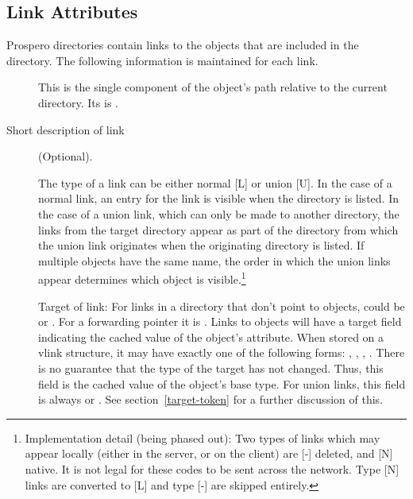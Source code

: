 \subsection{Link Attributes\label{target-attribute}}

Prospero directories contain links to the objects that are included in
the directory. The following information is maintained for each link.

\begin{description}

\item[] This is the single component of the
object's path relative to the current directory.  Its
 is .

\item[Short description of link] (Optional).

\item[]  The type of a link can be either 
normal [L] or union [U].  In the case of a normal link, an entry for
the link is visible when the directory is listed.  In the case of a
union link, which can only be made to another directory, the links
from the target directory appear as part of the directory from which
the union link originates when the originating directory is listed.
If multiple objects have the same name, the order in which the union
links appear determines which object is
visible.\footnote{Implementation detail (being phased out):
Two types of links which may appear locally (either in the server, or
on the client) are [-] deleted, and [N] native.  It is not legal for
these codes to be sent across the network.  Type [N] links are
converted to [L] and type [-] are skipped entirely.}

\item[]  Target of link:  For links in a directory that
don't point to objects, could be  or . For a
forwarding pointer it is .  Links to objects will have a target
field indicating the cached value of the object's 
attribute.  When stored on a vlink structure, it may have exactly one
of the following forms: , , ,
.  There is no guarantee that the type of the target
has not changed.  Thus, this field is the cached value of the object's
base type.  For union links, this field is always  or
.  See section~\ref{target-token} for a further
discussion of this.



\end{description}
